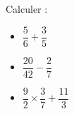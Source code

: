 \documentclass{beamer}
\begin{document}
\begin{frame}
	Calculer :

	\begin{multicols}{3}
		\begin{itemize}
			\item $\dfrac{5}{6} + \dfrac{3}{5}$
			\item $\dfrac{20}{42} - \dfrac{2}{7}$
			\item $\dfrac{9}{2} × \dfrac{3}{7} + \dfrac{11}{3}$
		\end{itemize}
	\end{multicols}
\end{frame}
\end{document}
